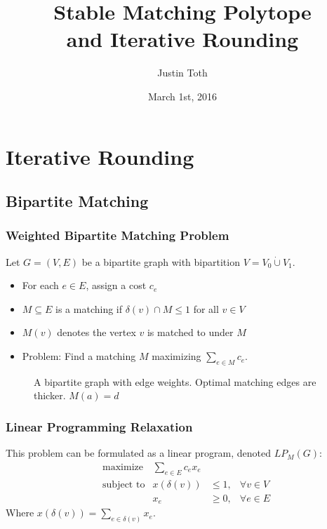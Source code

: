 \documentclass{beamer}
\author{Justin Toth}
\institute{University of Waterloo}
\date{March 1st, 2016}
\title{Stable Matching Polytope\\ and Iterative Rounding}
\begin{document}
\begin{frame}
\titlepage
\end{frame}

\section{Iterative Rounding}
\subsection{Bipartite Matching}

\begin{frame}
\frametitle{Weighted Bipartite Matching Problem}
Let $G=(V, E)$ be a bipartite graph with bipartition $V = V_0 \dot\cup V_1$. 
\begin{itemize}
\item For each $e \in E$, assign a cost $c_e$
\item $M \subseteq E$ is a matching if $\delta(v) \cap M \leq 1$ for all $v \in V$
\item $M(v)$ denotes the vertex $v$ is matched to under $M$
\item Problem: Find a matching $M$ maximizing $\sum_{e\in M} c_e$.
\end{itemize}
\begin{figure}
\centering
{}
\caption{A bipartite graph with edge weights. Optimal matching edges are thicker. $M(a) = d$}
\end{figure}
\end{frame}

\begin{frame}
\frametitle{Linear Programming Relaxation}
This problem can be formulated as a linear program, denoted $LP_M(G)$:
\begin{align*}
&\text{maximize} &\sum_{e \in E} c_e x_e \\
&\text{subject to} &x(\delta(v)) &\leq 1, &\forall v \in V\\
& &x_e &\geq 0, &\forall e \in E
\end{align*}
Where $x(\delta(v)) = \sum_{e \in \delta(v)} x_e$.
\end{frame}
\end{document}
